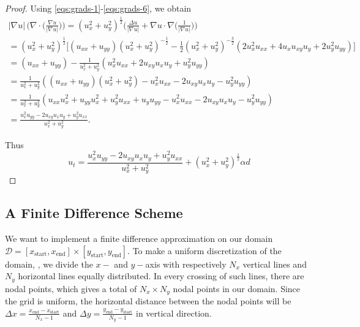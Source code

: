 \begin{proof}
Using \eqref{eqs:grads-1}-\eqref{eqs:grads-6}, we obtain
\begin{equation*}
    \begin{gathered}
        |\nabla u|\, \bigg(\nabla \cdot \bigg(\frac{\nabla u}{|\nabla u|}\bigg)\bigg)
        = (u_x ^2 + u_y ^2)^{\frac{1}{2}} \bigg( \frac{\Delta u}{|\nabla u|} + \nabla u \cdot \nabla \bigg(\frac{1}{|\nabla u|} \bigg) \bigg) \\
        = (u_x ^2 + u_y ^2)^{\frac{1}{2}} \bigg[ (u_{xx} + u_{yy}) (u_x ^2 + u_y ^2)^{-\frac{1}{2}} - \frac{1}{2} (u_x ^2 + u_y ^2)^{-\frac{3}{2}} (2u_x^2u_{xx}+4u_x u_{xy} u_y + 2u_y^2 u_{yy})\bigg] \\
        = (u_{xx} + u_{yy}) - \frac{1}{u_x^2+u_y^2} (u_x^2 u_{xx}+2u_{xy} u_x u_y + u_y^2 u_{yy}) \\
        = \frac{1}{u_x^2+u_y^2} ( (u_{xx} + u_{yy})(u_x^2 + u_y^2) - u_x^2 u_{xx}-2u_{xy} u_x u_y - u_y^2 u_{yy}) \\
        = \frac{1}{u_x^2+u_y^2}(u_{xx}u_x^2 + u_{yy}u_x^2 + u_y^2u_{xx}+ u_y u_{yy}-u_x^2 u_{xx}-2u_{xy} u_x u_y - u_y^2 u_{yy}) \\
        = \frac{u_x^2u_{yy} - 2u_{xy}u_xu_y + u_y^2u_{xx}}{u_x^2+u_y^2}.
    \end{gathered}
\end{equation*}

Thus 
\begin{equation*}
    u_t = \frac{u_x^2 u_{yy} - 2 u_{xy} u_x u_y + u_y^2u_{xx}}{u_x^2 + u_y^2} + (u_x^2 + u_y^2)^{\frac{1}{2}}\alpha d
\end{equation*}
\end{proof}


\subsection{A Finite Difference Scheme}
We want to implement a finite difference approximation on our domain $\mathcal{D} = [x_{\text{start}}, x_{\text{end}}]\times[y_{\text{start}}, y_{\text{end}}]$. To make a uniform discretization of the domain, \domain, we divide the $x-$ and $y-$axis with respectively $N_x$ vertical lines and $N_y$ horizontal lines equally distributed. In every crossing of such lines, there are nodal points, which gives a total of $N_x\times N_y$ nodal points in our domain. Since the grid is uniform, the horizontal distance between the nodal points will be $\Delta x = \frac{x_{\text{end}} - x_{\text{start}}}{N_x-1}$ and $\Delta y = \frac{y_{\text{end}} - y_{\text{start}}}{N_y-1}$ in vertical direction. 

